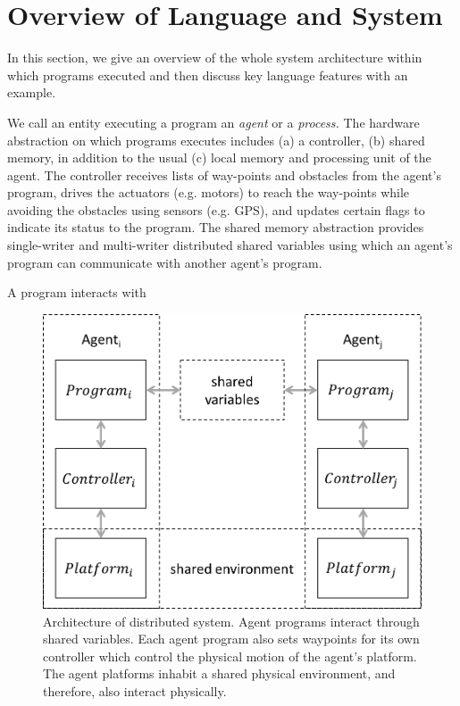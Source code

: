 \section{Overview of Language and System}
\label{sect:Overview}
In this section, we give an overview of the whole system architecture within which \rolang programs executed and then discuss key language features with an example.

We call an entity executing a \rolang program an {\em agent\/} or a {\em process.\/}
The hardware abstraction on which \rolang programs executes includes (a) a controller, (b) shared memory, in addition to the usual (c) local memory and processing unit of the agent.  
%
The controller receives lists of way-points and obstacles from the agent's program, drives the actuators (e.g. motors) to reach the way-points while avoiding the obstacles using sensors (e.g. GPS), and updates certain flags to indicate its status to the program.
%
The shared memory abstraction provides single-writer and multi-writer distributed shared variables using which an agent's program can communicate with another agent's program. 

A \rolang program interacts with 
\begin{figure}[t!]
	\centering
	\includegraphics[scale=0.4]{figs/arch.png}
	\caption{\small Architecture of distributed system. Agent programs interact through shared variables. Each agent program also sets waypoints for its own controller which control the physical motion of the agent's platform. The agent platforms inhabit a shared physical environment, and therefore, also interact physically.}
\end{figure}

